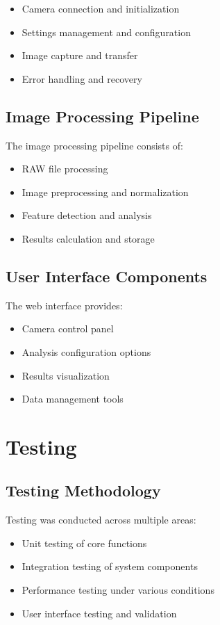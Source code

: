 \begin{itemize}
    \item Camera connection and initialization
    \item Settings management and configuration
    \item Image capture and transfer
    \item Error handling and recovery
\end{itemize}

\subsection{Image Processing Pipeline}
The image processing pipeline consists of:

\begin{itemize}
    \item RAW file processing
    \item Image preprocessing and normalization
    \item Feature detection and analysis
    \item Results calculation and storage
\end{itemize}

\subsection{User Interface Components}
The web interface provides:

\begin{itemize}
    \item Camera control panel
    \item Analysis configuration options
    \item Results visualization
    \item Data management tools
\end{itemize}

\section{Testing}

\subsection{Testing Methodology}
Testing was conducted across multiple areas:

\begin{itemize}
    \item Unit testing of core functions
    \item Integration testing of system components
    \item Performance testing under various conditions
    \item User interface testing and validation
\end{itemize}

